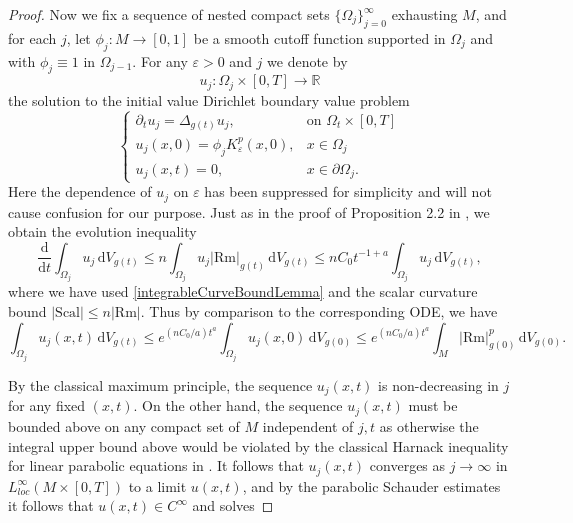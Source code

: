 \documentclass{amsart}
\theoremstyle{definition}
\newcommand{\Rm}{\mathrm{Rm}}
\newcommand{\dV}{\mathrm{d}V}
\begin{document}
\begin{proof}
Now we fix a sequence of nested compact sets $\{\Omega_j\}_{j=0}^\infty$ exhausting $M$, and for each $j$, let $\phi_j: M \to [0,1]$ be a smooth cutoff function  supported in $\Omega_j$ and with $\phi_j \equiv 1$ in $\Omega_{j-1}$. For any $\varepsilon > 0$ and $j$ we denote by 
\[
u_{j} : \Omega_j \times [0,T] \to \mathbb{R}
\] 
the solution to the initial value Dirichlet boundary value problem
\[
\begin{cases}
\partial_t u_{j} = \Delta_{g(t)} u_{j}, & \text{on }  \Omega_t\times[0, T] \\
u_{j}(x,0) = \phi_j K_{\varepsilon}^p(x,0), & x \in \Omega_j\\
u_{j}(x,t) = 0, & x \in \partial \Omega_j.
\end{cases}
\]
Here the dependence of $u_j$ on $\varepsilon$ has been suppressed for simplicity and will not cause confusion for our purpose.  Just as in the proof of Proposition 2.2 in \cite{ChauMartens}, we obtain the evolution inequality
\[
\frac{\mathrm{d}}{\mathrm{d}t}\int_{\Omega_j} u_{j} \,\dV_{g(t)} \le n\int_{\Omega_j} u_{j}|\mathrm{Rm}|_{g(t)} \,\dV_{g(t)}\le nC_0 t^{-1+a} \int_{\Omega_j} u_{j} \,\dV_{g(t)},
\]
where we have used \eqref{integrableCurveBoundLemma} and the scalar curvature bound $|\mathrm{Scal}|\leq n|\Rm|$. Thus by comparison to the corresponding ODE, we have
\[
\int_{\Omega_j} u_{j}(x, t) \,\dV_{g(t)}\leq e^{(nC_0/a)t^{a}}\int_{\Omega_j} u_{j}(x, 0) \,\dV_{g(0)} \le e^{(nC_0/a)t^{a}}\int_{M} |\mathrm{Rm}|_{g(0)}^p  \,\dV_{g(0)} .
\]

By the classical maximum principle, the sequence $u_j (x, t)$ is non-decreasing in $j$ for any fixed $(x, t)$.  On the other hand, the sequence $u_j(x, t)$ must be bounded above on any compact set of $M$ independent of $j, t$ as otherwise the integral upper bound above would be violated by the classical Harnack inequality for linear parabolic equations in \cite{KrylovSafanov}.  It follows that $u_j(x, t)$ converges as $j\to \infty$ in $L^{\infty}_{loc}(M\times[0, T])$ to a limit $u(x, t)$, and by the parabolic Schauder estimates it follows that $u(x, t)\in C^{\infty}$ and solves


\end{proof}
\end{document}
